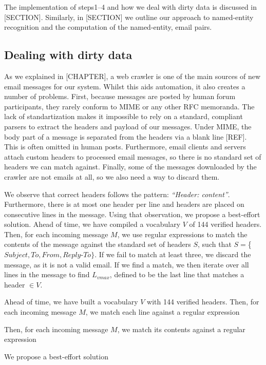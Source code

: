 The implementation of steps1--4 and how we deal with dirty data is discussed in [SECTION]. Similarly, in [SECTION] we outline our approach to named-entity recognition and the computation of the named-entity, email pairs.

\subsection{Dealing with dirty data}
As we explained in [CHAPTER], a web crawler is one of the main sources of new email messages for our system. Whilst this aids automation, it also creates a number of problems. First, because messages are posted by human forum participants, they rarely conform to MIME or any other RFC memoranda. The lack of standartization makes it impossible to rely on a standard, compliant parsers to extract the headers and payload of our messages. Under MIME, the body part of a message is separated from the headers via a blank line [REF]. This is often omitted in human posts. Furthermore, email clients and servers attach custom headers to processed email messages, so there is no standard set of headers we can match against. Finally, some of the messages downloaded by the crawler are not emails at all, so we also need a way to discard them.

We observe that correct headers follows the pattern: \textit{``Header: content''}. Furthermore, there is at most one header per line and headers are placed on consecutive lines in the message. Using that observation, we propose a best-effort solution. Ahead of time, we have compiled a vocabulary $V$ of 144 verified headers. Then, for each incoming message $M$, we use regular expressions to match the contents of the message against the standard set of headers $S$, such that $S = $\{$Subject, To, From, Reply$-$To\}$. If we fail to match at least three, we discard the message, as it is not a valid email. If we find a match, we then iterate over all lines in the message to find $L_{vmax}$, defined to be the last line that matches a header $\in V$.



Ahead of time, we have built a vocabulary $V$ with 144 verified headers. Then, for each incoming message $M$, we match each line against a regular expression 



Then, for each incoming message $M$, we match its contents against a regular expression


We propose a best-effort solution


